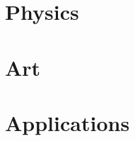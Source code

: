 \documentclass{book}
\begin{document}
\chapter{Physics}


\chapter{Art}


%


\chapter{Applications}











%

\end{document}
